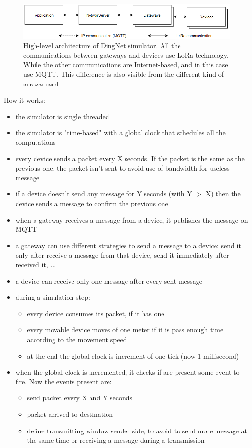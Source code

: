 \begin{figure}[h]
    \centering
    \includegraphics[scale=0.8]{images/dingNet-arch.png}
    \caption{High-level architecture of DingNet simulator. All the communications between gateways and devices use LoRa technology. While the other communications are Internet-based, and in this case use MQTT. This difference is also visible from the different kind of arrows used.}
    \label{fig:dingARch}
\end{figure}
\clearpage
How it works:
\begin{itemize}
    \item the simulator is single threaded
    \item the simulator is "time-based" with a global clock that schedules all the computations
    \item every device sends a packet every X seconds. If the packet is the same as the previous one, the packet isn't sent to avoid use of bandwidth for useless message
    \item if a device doesn't send any message for Y seconds (with Y $>$ X) then the device sends a message to confirm the previous one
    \item when a gateway receives a message from a device, it publishes the message on MQTT
    \item a gateway can use different strategies to send a message to a device: send it only after receive a message from that device, send it immediately after received it, ...
    \item a device can receive only one message after every sent message
    \item during a simulation step:
    \begin{itemize}
        \item every device consumes its packet, if it has one
        \item every movable device moves of one meter if it is pass enough time according to the movement speed
        \item at the end the global clock is increment of one tick (now 1 millisecond)
    \end{itemize}
    \item when the global clock is incremented, it checks if are present some event to fire. Now the events present are: 
    \begin{itemize}
        \item send packet every X and Y seconds
        \item packet arrived to destination
        \item define transmitting window sender side, to avoid to send more message at the same time or receiving a message during a transmission
    \end{itemize}
\end{itemize}